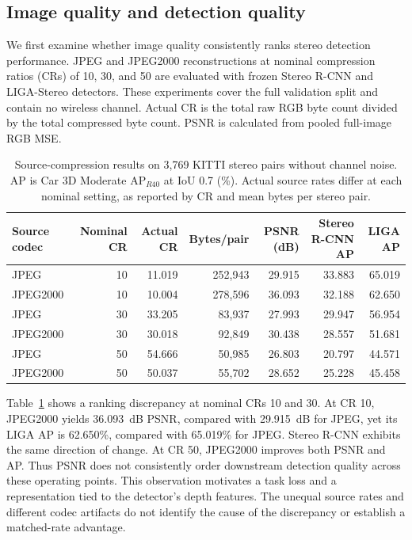 \documentclass[conference]{IEEEtran}
\begin{document}
\subsection{Image quality and detection quality}
We first examine whether image quality consistently ranks stereo detection
performance. JPEG and JPEG2000 reconstructions at nominal compression
ratios (CRs) of 10, 30, and 50 are evaluated with frozen Stereo R-CNN and
LIGA-Stereo detectors. These experiments cover the full validation split
and contain no wireless channel. Actual CR is the total raw RGB byte count
divided by the total compressed byte count. PSNR is calculated from pooled
full-image RGB MSE.

\begin{table}[t]
\centering
\caption{Source-compression results on 3,769 KITTI stereo pairs without
channel noise. AP is Car 3D Moderate AP$_{R40}$ at IoU 0.7 (\%). Actual
source rates differ at each nominal setting, as reported by CR and mean
bytes per stereo pair.}
\label{tab:rgb}
\begin{tabular}{lrrrrrr}
\toprule
Source codec & Nominal CR & Actual CR & Bytes/pair & PSNR (dB) & Stereo R-CNN AP & LIGA AP\\
\midrule
JPEG & 10 & 11.019 & 252,943 & 29.915 & 33.883 & 65.019\\
JPEG2000 & 10 & 10.004 & 278,596 & 36.093 & 32.188 & 62.650\\
JPEG & 30 & 33.205 & 83,937 & 27.993 & 29.947 & 56.954\\
JPEG2000 & 30 & 30.018 & 92,849 & 30.438 & 28.557 & 51.681\\
JPEG & 50 & 54.666 & 50,985 & 26.803 & 20.797 & 44.571\\
JPEG2000 & 50 & 50.037 & 55,702 & 28.652 & 25.228 & 45.458\\
\bottomrule
\end{tabular}
\end{table}

Table~\ref{tab:rgb} shows a ranking discrepancy at nominal CRs 10 and 30.
At CR 10, JPEG2000 yields 36.093~dB PSNR, compared with 29.915~dB for JPEG,
yet its LIGA AP is 62.650\%, compared with 65.019\% for JPEG. Stereo R-CNN
exhibits the same direction of change. At CR 50, JPEG2000 improves both
PSNR and AP. Thus PSNR does not consistently order downstream detection
quality across these operating points. This observation motivates a task
loss and a representation tied to the detector's depth features. The
unequal source rates and different codec artifacts do not identify the
cause of the discrepancy or establish a matched-rate advantage.
\end{document}
